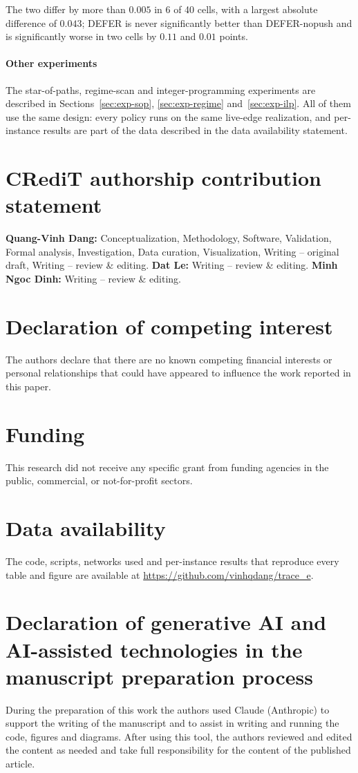 \documentclass[preprint,11pt]{elsarticle}
\theoremstyle{definition}
\theoremstyle{remark}
\begin{document}
The two differ by more than $0.005$ in 6 of 40 cells, with a largest absolute difference of $0.043$; DEFER is never significantly better than DEFER-nopush and is significantly worse in two cells by $0.11$ and $0.01$ points.

\paragraph{Other experiments} The star-of-paths, regime-scan and integer-programming experiments are described in Sections~\ref{sec:exp-sop}, \ref{sec:exp-regime} and~\ref{sec:exp-ilp}. All of them use the same design: every policy runs on the same live-edge realization, and per-instance results are part of the data described in the data availability statement.

\section*{CRediT authorship contribution statement}
\textbf{Quang-Vinh Dang:} Conceptualization, Methodology, Software, Validation, Formal analysis, Investigation, Data curation, Visualization, Writing -- original draft, Writing -- review \& editing. \textbf{Dat Le:} Writing -- review \& editing. \textbf{Minh Ngoc Dinh:} Writing -- review \& editing.

\section*{Declaration of competing interest}
The authors declare that there are no known competing financial interests or personal relationships that could have appeared to influence the work reported in this paper.

\section*{Funding}
This research did not receive any specific grant from funding agencies in the public, commercial, or not-for-profit sectors.

\section*{Data availability}
The code, scripts, networks used and per-instance results that reproduce every table and figure are available at \url{https://github.com/vinhqdang/trace_e}.

\section*{Declaration of generative AI and AI-assisted technologies in the manuscript preparation process}
During the preparation of this work the authors used Claude (Anthropic) to support the writing of the manuscript and to assist in writing and running the code, figures and diagrams. After using this tool, the authors reviewed and edited the content as needed and take full responsibility for the content of the published article.
\end{document}
